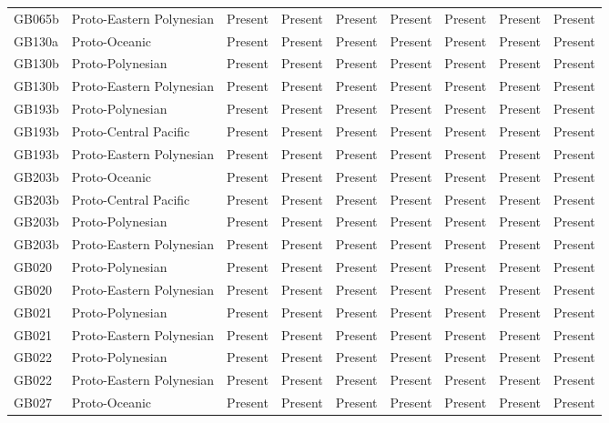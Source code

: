 \begin{longtable}{p{1.5cm}p{2.5cm}p{2.5cm}p{2.5cm}p{2.5cm}p{2.5cm}p{2.5cm}p{2.5cm}p{2.5cm}}
  GB065b & Proto-Eastern Polynesian & Present & Present & Present & Present & Present & Present & Present \\ 
  GB130a & Proto-Oceanic & Present & Present & Present & Present & Present & Present & Present \\ 
  GB130b & Proto-Polynesian & Present & Present & Present & Present & Present & Present & Present \\ 
  GB130b & Proto-Eastern Polynesian & Present & Present & Present & Present & Present & Present & Present \\ 
  GB193b & Proto-Polynesian & Present & Present & Present & Present & Present & Present & Present \\ 
  GB193b & Proto-Central Pacific & Present & Present & Present & Present & Present & Present & Present \\ 
  GB193b & Proto-Eastern Polynesian & Present & Present & Present & Present & Present & Present & Present \\ 
  GB203b & Proto-Oceanic & Present & Present & Present & Present & Present & Present & Present \\ 
  GB203b & Proto-Central Pacific & Present & Present & Present & Present & Present & Present & Present \\ 
  GB203b & Proto-Polynesian & Present & Present & Present & Present & Present & Present & Present \\ 
  GB203b & Proto-Eastern Polynesian & Present & Present & Present & Present & Present & Present & Present \\ 
  GB020 & Proto-Polynesian & Present & Present & Present & Present & Present & Present & Present \\ 
  GB020 & Proto-Eastern Polynesian & Present & Present & Present & Present & Present & Present & Present \\ 
  GB021 & Proto-Polynesian & Present & Present & Present & Present & Present & Present & Present \\ 
  GB021 & Proto-Eastern Polynesian & Present & Present & Present & Present & Present & Present & Present \\ 
  GB022 & Proto-Polynesian & Present & Present & Present & Present & Present & Present & Present \\ 
  GB022 & Proto-Eastern Polynesian & Present & Present & Present & Present & Present & Present & Present \\ 
  GB027 & Proto-Oceanic & Present & Present & Present & Present & Present & Present & Present \\ 

\end{longtable}
